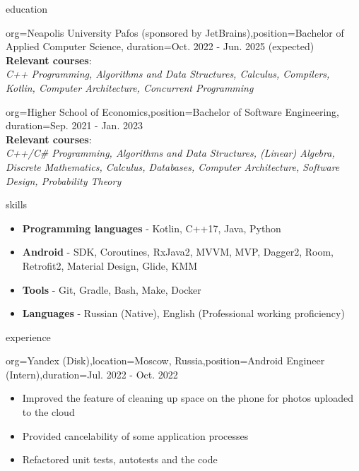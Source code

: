 \documentclass{resume}
\begin{document}
\makeheader

\begin{ResumeSection}{education}
    \begin{ResumeSubsection}{org={Neapolis University Pafos (sponsored by JetBrains)},position={Bachelor of Applied Computer Science}, duration={Oct. 2022 - Jun. 2025 (expected)}} \\
    \textbf{Relevant courses}: \\
    \textit{C++ Programming, Algorithms and Data Structures, Calculus, Compilers, Kotlin, Computer Architecture, Concurrent Programming} \\ 
    \end{ResumeSubsection}
	\begin{ResumeSubsection}{org={Higher School of Economics},position={Bachelor of Software Engineering}, duration={Sep. 2021 - Jan. 2023}} \\
    \textbf{Relevant courses}: \\
    \textit{C++/C\# Programming, Algorithms and Data Structures, (Linear) Algebra, Discrete Mathematics, Calculus, Databases, Computer Architecture, Software Design, Probability Theory}
    \end{ResumeSubsection}
\end{ResumeSection}

\begin{ResumeSection}{skills}
    \newcommand{\skill}[2]{\textbf{#1} - #2}
        \begin{itemize}
            \item \skill{Programming languages}{Kotlin, C++17, Java, Python}
            \item \skill{Android}{SDK, Coroutines, RxJava2, MVVM, MVP, Dagger2, Room, Retrofit2, Material Design, Glide, KMM}
            \item \skill{Tools}{Git, Gradle, Bash, Make, Docker}
            \item \skill{Languages}{Russian (Native), English (Professional working proficiency)}
        \end{itemize}
\end{ResumeSection}

\begin{ResumeSection}{experience}
    \begin{ResumeSubsection}{org=Yandex (Disk),location={Moscow, Russia},position={Android Engineer (Intern)},duration=Jul. 2022 - Oct. 2022} 
        \begin{itemize}
            \item Improved the feature of cleaning up space on the phone for photos uploaded to the cloud
            \item Provided cancelability of some application processes
            \item Refactored unit tests, autotests and the code
        \end{itemize}
    \end{ResumeSubsection}
\end{ResumeSection}
\end{document}

